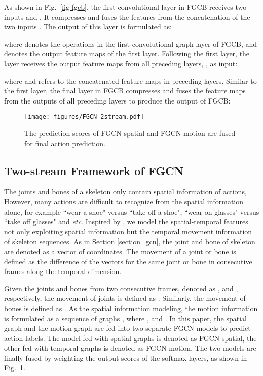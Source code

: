 \documentclass[runningheads]{llncs}
\begin{document}
As shown in Fig.~\ref{fig-fgcb}, the first convolutional layer in FGCB receives two inputs  and . It compresses and fuses the features from the concatenation of the two inputs . The output of this layer is formulated as:

where  denotes the operations in the first convolutional graph layer of FGCB, and  denotes the output feature maps of the first layer. Following the first layer, the  layer receives the output feature maps from all preceding layers, , as input:

where  and  refers to the concatenated feature maps in preceding layers. Similar to the first layer, the final layer in FGCB compresses and fuses the feature maps from the outputs of all preceding layers to produce the output of FGCB:

\vspace{-6mm}

\begin{figure}[t]
	\centering
	\texttt{[image: figures/FGCN-2stream.pdf]}
	\caption{The prediction scores of FGCN-spatial and FGCN-motion are fused for final action prediction.}
	\vspace{-4mm}
	\label{fig-2stream}
\end{figure}

\subsection{Two-stream Framework of FGCN}
The joints and bones of a skeleton only contain spatial information of actions, However, many actions are difficult to recognize from the spatial information alone, for example ``wear a shoe" versus ``take off a shoe", ``wear on glasses" versus ``take off glasses" and \textit{etc}. Inspired by \cite{shi2019skeleton}, we model the spatial-temporal features not only exploiting spatial information but the temporal movement information of skeleton sequences. As in Section \ref{section_gcn}, the joint and bone of skeleton are denoted as a vector of coordinates. The movement of a joint or bone is defined as the difference of the vectors for the same joint or bone in consecutive frames along the temporal dimension.

Given the joints and bones from two consecutive frames, denoted as ,  and ,  respectively, the movement of joints is defined as . Similarly, the movement of bones is defined as .
As the spatial information modeling, the motion information is formulated as a sequence of graphs 
, where ,  and . In this paper, the spatial graph  and the motion graph  are fed into two separate FGCN models to predict action labels. The model fed with spatial graphs  is denoted as FGCN-spatial, the other fed with temporal graphs  is denoted as FGCN-motion. The two models are finally fused by weighting the output scores of the softmax layers, as shown in Fig.~\ref{fig-2stream}.
\end{document}
